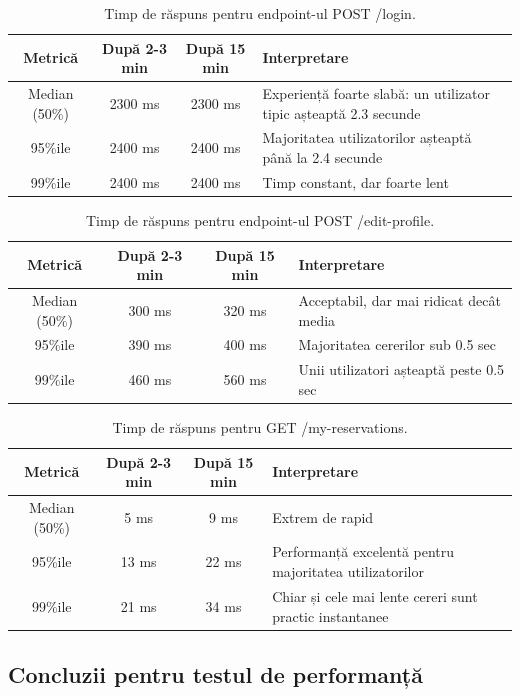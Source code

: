 \documentclass[12pt, a4paper, oneside, romanian]{teza-upb}
\begin{document}
\begin{table}[h!]
\centering
\begin{tabular}{c|c|c|p{6cm}}
\hline
Metrică & După 2-3 min & După 15 min & Interpretare \\
\hline
Median (50\%) & 2300 ms & 2300 ms & Experiență foarte slabă: un utilizator tipic așteaptă 2.3 secunde \\
95\%ile & 2400 ms & 2400 ms & Majoritatea utilizatorilor așteaptă până la 2.4 secunde \\
99\%ile & 2400 ms & 2400 ms & Timp constant, dar foarte lent \\
\hline
\end{tabular}
\caption{Timp de răspuns pentru endpoint-ul POST /login.}
\label{tab:login}
\end{table}

\begin{table}[h!]
\centering
\begin{tabular}{c|c|c|p{6cm}}
\hline
Metrică & După 2-3 min & După 15 min & Interpretare \\
\hline
Median (50\%) & 300 ms & 320 ms & Acceptabil, dar mai ridicat decât media \\
95\%ile & 390 ms & 400 ms & Majoritatea cererilor sub 0.5 sec \\
99\%ile & 460 ms & 560 ms & Unii utilizatori așteaptă peste 0.5 sec \\
\hline
\end{tabular}
\caption{Timp de răspuns pentru endpoint-ul POST /edit-profile.}
\label{tab:edit-profile}
\end{table}

\begin{table}[h!]
\centering
\begin{tabular}{c|c|c|p{6cm}}
\hline
Metrică & După 2-3 min & După 15 min & Interpretare \\
\hline
Median (50\%) & 5 ms & 9 ms & Extrem de rapid \\
95\%ile & 13 ms & 22 ms & Performanță excelentă pentru majoritatea utilizatorilor \\
99\%ile & 21 ms & 34 ms & Chiar și cele mai lente cereri sunt practic instantanee \\
\hline
\end{tabular}
\caption{Timp de răspuns pentru GET /my-reservations.}
\label{tab:my-reservations}
\end{table}

\subsection*{Concluzii pentru testul de performanță}
\end{document}
